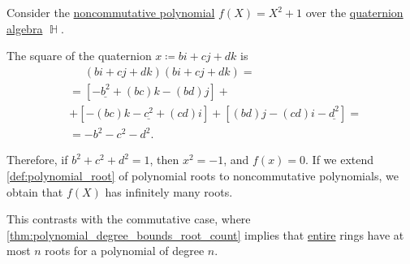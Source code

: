 \begin{example}\label{ex:quaternion_polynomial_with_infinitely_many_roots}
  Consider the \hyperref[def:noncommutative_polynomial_algebra]{noncommutative polynomial} \( f(X) = X^2 + 1 \) over the \hyperref[def:quaternion_algebra]{quaternion algebra} \( \BbbH \).

  The square of the quaternion \( x \coloneqq bi + cj + dk \) is
  \begin{align*}
    &\phantom{{}={}}
    (bi + cj + dk) (bi + cj + dk)
    = \\ &=
    [-\underline{b^2} + (bc)k - (bd)j]
    + \\ &+
    [-(bc)k - \underline{c^2} + (cd)i]
    +
    [(bd)j - (cd)i - \underline{d^2}]
    = \\ &=
    -b^2 - c^2 - d^2.
  \end{align*}

  Therefore, if \( b^2 + c^2 + d^2 = 1 \), then \( x^2 = -1 \), and \( f(x) = 0 \). If we extend \cref{def:polynomial_root} of polynomial roots to noncommutative polynomials, we obtain that \( f(X) \) has infinitely many roots.

  This contrasts with the commutative case, where \cref{thm:polynomial_degree_bounds_root_count} implies that \hyperref[def:entire_semiring]{entire} rings have at most \( n \) roots for a polynomial of degree \( n \).
\end{example}

